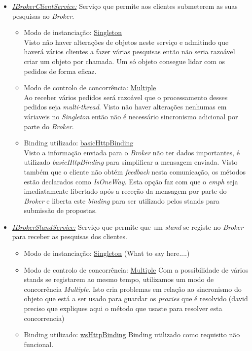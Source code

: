 \documentclass[a4paper]{article}
\begin{document}
\begin{itemize} 

\item
\emph{\underline{IBrokerClientService:}}
Serviço que permite aos clientes submeterem as suas pesquisas ao \emph{Broker}.
	\begin{itemize}
		\item
		Modo de instanciação: \underline{Singleton}\\
		Visto não haver alterações de objetos neste serviço e admitindo que haverá vários clientes a fazer várias pesquisas então não seria razoável criar um objeto por chamada. Um só objeto consegue lidar com os pedidos de forma eficaz.
		\item
		Modo de controlo de concorrência: \underline{Multiple}\\
		Ao receber vários pedidos será razoável que o processamento desses pedidos seja \emph{multi-thread}. Visto não haver alterações nenhumas em váriaveis no \emph{Singleton} então não é necessário sincronismo adicional por parte do \emph{Broker}.
		\item
		Binding utilizado: \underline{basicHttpBinding}\\
		Visto a informação enviada para o \emph{Broker} não ter dados importantes, é utilizado \emph{basicHttpBinding} para simplificar a mensagem enviada. Visto também que o cliente não obtém \emph{feedback} nesta comunicação, os métodos estão declarados como \emph{IsOneWay}. Esta opção faz com que o \emph{emph} seja imediatamente libertado após a receção da mensagem por parte do \emph{Broker} e liberta este \emph{binding } para ser utilizado pelos stands para submissão de propostas.
	\end{itemize}
\item
\emph{\underline{IBrokerStandService:}}
Serviço que permite que um \emph{stand} se registe no \emph{Broker} para receber as pesquisas dos clientes.
		\begin{itemize}
		\item
		Modo de instanciação: \underline{Singleton}
		(What to say here....)
		\item
		Modo de controlo de concorrência: \underline{Multiple}
		Com a possibilidade de vários stands se registarem ao mesmo tempo, utilizamos um modo de concorrência \emph{Multiple}. Isto cria problemas em relação ao sincronismo do objeto que está a ser usado para guardar os \emph{proxies} que é resolvido (david preciso que expliques aqui o método que usaste para resolver esta concorrencia)
		
		\item
		Binding utilizado: \underline{wsHttpBinding}
		Binding utilizado como requisito não funcional.
	\end{itemize}
\end{itemize}
\end{document}
